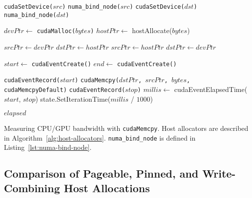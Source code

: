 \begin{algorithm}[H]
	\begin{algorithmic}[1]
		\Statex
		\State \texttt{cudaSetDevice($src$)}
		\Else {}
		\State \texttt{numa\_bind\_node($src$)}
		\EndIf
		\State \texttt{cudaSetDevice($dst$)}
		\Else {}
		\State \texttt{numa\_bind\_node($dst$)}
		\EndIf
		
		\State $devPtr \gets$ \texttt{cudaMalloc($bytes$)} 
		\State $hostPtr \gets$ hostAllocate($bytes$) 

		\State $srcPtr \gets devPtr$
		\State $dstPtr \gets hostPtr$
		\Else {}
		\State $srcPtr \gets hostPtr$
		\State $dstPtr \gets devPtr$
		\EndIf

		\State $start \gets$ \texttt{cudaEventCreate()}
		\State $end \gets$ \texttt{cudaEventCreate()}

		\State \texttt{cudaEventRecord($start$)}
		\State \texttt{cudaMemcpy($dstPtr$, $srcPtr$, $bytes$, cudaMemcpyDefault)}
		\State \texttt{cudaEventRecord($stop$)}
		\State $millis \gets$ cudaEventElapsedTime($start$, $stop$)
		\State state.SetIterationTime($millis$ / $1000$)
        \EndFor
		
		\Return $elapsed$
		\EndFunction
		
	\end{algorithmic}
	\caption[Measuring CPU/GPU bandwidth with \texttt{cudaMemcpy}.]{
		Measuring CPU/GPU bandwidth with \texttt{cudaMemcpy}.
		Host allocators are described in Algorithm~\ref{alg:host-allocators}.
		\texttt{numa\_bind\_node} is defined in Listing~\ref{lst:numa-bind-node}.
	}
	\label{alg:explicit-cpu-gpu}
\end{algorithm}

\subsection{Comparison of Pageable, Pinned, and Write-Combining Host Allocations}
\label{sec:explicit-pageable-pinned-wc}

